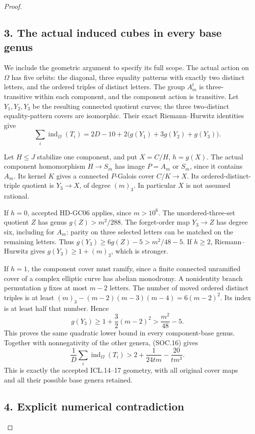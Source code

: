 \begin{proof}
\subsection*{3. The actual induced cubes in every base genus}

We include the geometric argument to specify its full scope.
The actual action on \(\Omega\) has five orbits: the diagonal,
three equality patterns with exactly two distinct letters, and the
ordered triples of distinct letters. The group \(A_m^t\) is
three-transitive within each component, and the component action is
transitive. Let \(Y_1,Y_2,Y_3\) be the resulting connected quotient
curves; the three two-distinct equality-pattern covers are isomorphic.
Their exact Riemann--Hurwitz identities give
\[
 \sum_i\operatorname{ind}_\Omega(T_i)
 =2D-10+2\bigl(g(Y_1)+3g(Y_2)+g(Y_3)\bigr).
 \tag{SOC.16}
\]

Let \(H\le J\) stabilize one component, and put \(X=C/H\),
\(h=g(X)\). The actual component homomorphism \(H\to S_m\)
has image \(P=A_m\) or \(S_m\), since it contains \(A_m\).
Its kernel \(K\) gives a connected \(P\)-Galois cover
\(C/K\longrightarrow X\). Its ordered-distinct-triple quotient
is \(Y_3\longrightarrow X\), of degree \((m)_3\).
In particular \(X\) is not assumed rational.

If \(h=0\), accepted HD-GC06 applies, since \(m>10^6\).
The unordered-three-set quotient \(Z\) has genus \(g(Z)>m^2/288\).
The forget-order map \(Y_3\to Z\) has degree six, including for
\(A_m\): parity on three selected letters can be matched on the
remaining letters. Thus \(g(Y_3)\ge6g(Z)-5>m^2/48-5\).
If \(h\ge2\), Riemann--Hurwitz gives \(g(Y_3)\ge1+(m)_3\),
which is stronger.

If \(h=1\), the component cover must ramify, since a finite connected
unramified cover of a complex elliptic curve has abelian monodromy.
A nonidentity branch permutation \(y\) fixes at most \(m-2\) letters.
The number of moved ordered distinct triples is at least
\((m)_3-(m-2)(m-3)(m-4)=6(m-2)^2\).
Its index is at least half that number. Hence
\[
       g(Y_3)\ge1+\frac32(m-2)^2>\frac{m^2}{48}-5.
 \tag{SOC.17}
\]
This proves the same quadratic lower bound in every component-base
genus. Together with nonnegativity of the other genera, (SOC.16) gives
\[
 \frac1D\sum_i\operatorname{ind}_\Omega(T_i)
       >2+\frac1{24tm}-\frac{20}{tm^3}.
 \tag{SOC.18}
\]
This is exactly the accepted ICL.14--17 geometry, with all original
cover maps and all their possible base genera retained.

\subsection*{4. Explicit numerical contradiction}


\end{proof}
